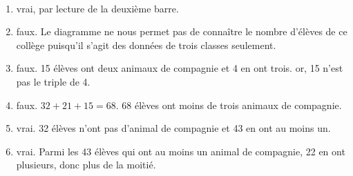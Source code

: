 \ \\ [-5mm]
   \begin{enumerate}
      \item {\blue vrai}, par lecture de la deuxième barre.
      \item {\blue faux}. Le diagramme ne nous permet pas de connaître le nombre d'élèves de ce collège puisqu'il s'agit des données de trois classes seulement.
      \item {\blue faux}. 15 élèves ont deux animaux de compagnie et  4 en ont trois. or, 15 n'est pas le triple de 4.
      \item {\blue faux}. $32+21+15 =68$. 68 élèves ont moins de trois animaux de compagnie.
      \item {\blue vrai}. 32 élèves n'ont pas d'animal de compagnie et 43 en ont au moins un.
      \item {\blue vrai}. Parmi les 43 élèves qui ont au moins un animal de compagnie, 22 en ont plusieurs, donc plus de la moitié.
   \end{enumerate}
